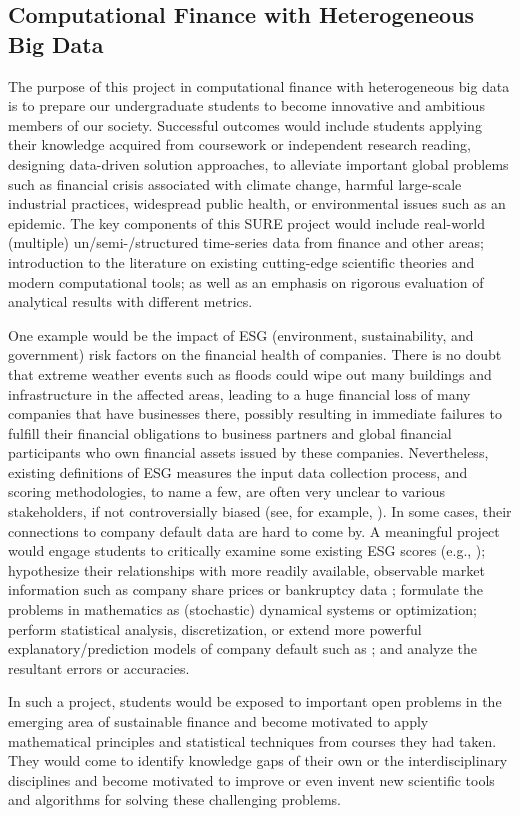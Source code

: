 
\subsection{Computational Finance with Heterogeneous Big Data}

The purpose of this project in computational finance with heterogeneous big data is to prepare our undergraduate students to become innovative and ambitious members of our society. Successful outcomes would include students applying their knowledge acquired from coursework or independent research reading,  designing data-driven solution approaches, to alleviate important global problems such as financial crisis associated with climate change, harmful large-scale industrial practices, widespread public health, or environmental issues such as an epidemic.  The key components of this SURE project would include real-world (multiple) un/semi-/structured time-series data from finance and other areas; introduction to the literature on existing cutting-edge scientific theories and modern computational tools; as well as an emphasis on rigorous evaluation of analytical results with different metrics. 

One example would be the impact of ESG (environment, sustainability, and government) risk factors on the financial health of companies. There is no doubt that extreme weather events such as floods could wipe out many buildings and infrastructure in the affected areas, leading to a huge financial loss of many companies that have businesses there, possibly resulting in immediate failures to fulfill their financial obligations to business partners and global financial participants who own financial assets issued by these companies. Nevertheless, existing definitions of ESG measures the input data collection process, and scoring methodologies, to name a few, are often very unclear to various stakeholders, if not controversially biased (see, for example, \cite{reiser2019buyer}). In some cases, their connections to company default data are hard to come by. A meaningful project would engage students to critically examine some existing ESG scores (e.g., \cite{friede2015esg}); hypothesize their relationships with more readily available, observable market information such as company share prices or bankruptcy data \cite{pedersen2020responsible, fatemi2018esg}; formulate the problems in mathematics as (stochastic) dynamical systems or optimization; perform statistical analysis, discretization, or extend more powerful explanatory/prediction models of company default such as \cite{jarrow2005default}; and analyze the resultant errors or accuracies. 

In such a project, students would be exposed to important open problems in the emerging area of sustainable finance and become motivated to apply mathematical principles and statistical techniques from courses they had taken. They would come to identify knowledge gaps of their own or the interdisciplinary disciplines and become motivated to improve or even invent new scientific tools and algorithms for solving these challenging problems.
